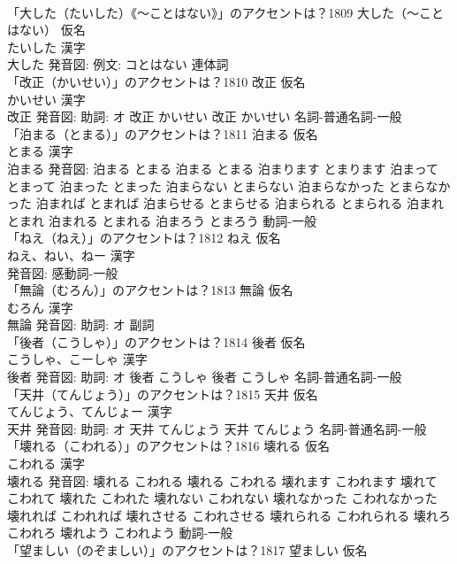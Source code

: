 \documentclass[8pt]{extreport}
\begin{document}
\begin{CJK}{UTF8}{min}
\\	「大した（たいした）《〜ことはない》」のアクセントは？1809	大した（〜ことはない） 仮名　
\\	たいした 漢字　
\\	大した 発音図: 例文: コとはない							連体詞 
\\	「改正（かいせい）」のアクセントは？1810	改正 仮名　
\\	かいせい 漢字　
\\	改正 発音図: 助詞: オ	改正 かいせい		改正 かいせい				名詞-普通名詞-一般 
\\	「泊まる（とまる）」のアクセントは？1811	泊まる 仮名　
\\	とまる 漢字　
\\	泊まる 発音図:	泊まる とまる		泊まる とまる 泊まります とまります 泊まって とまって 泊まった とまった 泊まらない とまらない 泊まらなかった とまらなかった 泊まれば とまれば 泊まらせる とまらせる 泊まられる とまられる 泊まれ とまれ 泊まれる とまれる 泊まろう とまろう				動詞-一般 
\\	「ねえ（ねえ）」のアクセントは？1812	ねえ 仮名　
\\	ねえ、ねい、ねー 漢字　
\\	発音図:							感動詞-一般 
\\	「無論（むろん）」のアクセントは？1813	無論 仮名　
\\	むろん 漢字　
\\	無論 発音図: 助詞: オ							副詞 
\\	「後者（こうしゃ）」のアクセントは？1814	後者 仮名　
\\	こうしゃ、こーしゃ 漢字　
\\	後者 発音図: 助詞: オ	後者 こうしゃ		後者 こうしゃ				名詞-普通名詞-一般 
\\	「天井（てんじょう）」のアクセントは？1815	天井 仮名　
\\	てんじょう、てんじょー 漢字　
\\	天井 発音図: 助詞: オ	天井 てんじょう		天井 てんじょう				名詞-普通名詞-一般 
\\	「壊れる（こわれる）」のアクセントは？1816	壊れる 仮名　
\\	こわれる 漢字　
\\	壊れる 発音図:	壊れる こわれる		壊れる こわれる 壊れます こわれます 壊れて こわれて 壊れた こわれた 壊れない こわれない 壊れなかった こわれなかった 壊れれば こわれれば 壊れさせる こわれさせる 壊れられる こわれられる 壊れろ こわれろ 壊れよう こわれよう				動詞-一般 
\\	「望ましい（のぞましい）」のアクセントは？1817	望ましい 仮名　

\end{CJK}
\end{document}
